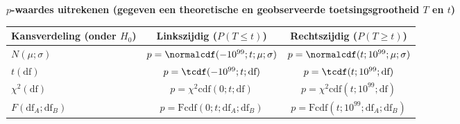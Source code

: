     \textbf{$p$-waardes uitrekenen (gegeven een theoretische en geobserveerde toetsingsgrootheid $T$ en $t$)}
    \begin{table}[H]
        \centering
        \renewcommand{\arraystretch}{1.5}
        \begin{tabular}{m{2.5cm}|cc}
            \toprule
                \textbf{Kansverdeling (onder $H_0$)} & \textbf{Linkszijdig ($P(T \le t)$)} & \textbf{Rechtszijdig ($P(T \ge t)$)} \\
            \midrule
                $N(\mu; \sigma)$ & $p = \normalcdf(-10^{99}; t; \mu; \sigma)$ & $p = \normalcdf(t; 10^{99}; \mu; \sigma)$ \\
            \midrule
                $t(\text{df})$ & $p = \tcdf(-10^{99}; t; \text{df})$ & $p = \tcdf(t; 10^{99}; \text{df})$\\
            \midrule
                $\chi^2(\text{df})$ & $p = \chi^2\text{cdf}(0; t; \text{df})$ & $p = \chi^2\text{cdf}(t; 10^{99}; \text{df})$ \\
            \midrule
                $F(\text{df}_A; \text{df}_B)$ & $p = \text{Fcdf}(0; t; \text{df}_A; \text{df}_B)$ & $p = \text{Fcdf}(t; 10^{99}; \text{df}_A; \text{df}_B)$ \\
            \bottomrule
        \end{tabular}
    \end{table}

